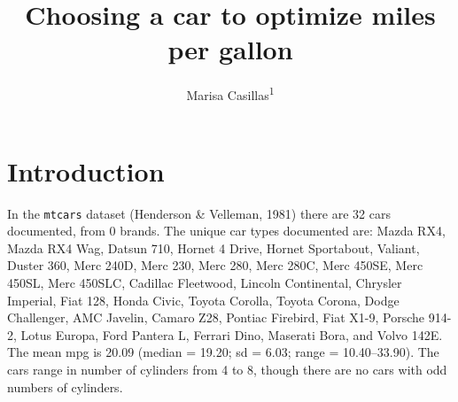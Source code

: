 \documentclass[
  english,
  man,floatsintext]{apa6}
\title{Choosing a car to optimize miles per gallon}
\author{Marisa Casillas\textsuperscript{1}}
\date{}
\affiliation{\vspace{0.5cm}\textsuperscript{1} University of Chicago}
\begin{document}
\maketitle

\hypertarget{introduction}{%
\section{Introduction}\label{introduction}}

In the \texttt{mtcars} dataset (Henderson \& Velleman, 1981) there are 32 cars documented, from 0 brands. The unique car types documented are: Mazda RX4, Mazda RX4 Wag, Datsun 710, Hornet 4 Drive, Hornet Sportabout, Valiant, Duster 360, Merc 240D, Merc 230, Merc 280, Merc 280C, Merc 450SE, Merc 450SL, Merc 450SLC, Cadillac Fleetwood, Lincoln Continental, Chrysler Imperial, Fiat 128, Honda Civic, Toyota Corolla, Toyota Corona, Dodge Challenger, AMC Javelin, Camaro Z28, Pontiac Firebird, Fiat X1-9, Porsche 914-2, Lotus Europa, Ford Pantera L, Ferrari Dino, Maserati Bora, and Volvo 142E. The mean mpg is 20.09 (median = 19.20; sd = 6.03; range = 10.40--33.90). The cars range in number of cylinders from 4 to 8, though there are no cars with odd numbers of cylinders.
\end{document}
